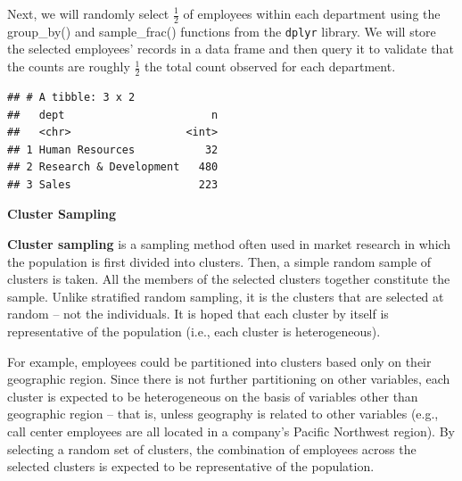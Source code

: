 \documentclass[]{book}
\newenvironment{Shaded}{\begin{snugshade}}{\end{snugshade}}
\newcommand{\CommentTok}[1]{\textcolor[rgb]{0.56,0.35,0.01}{\textit{#1}}}
\newcommand{\DataTypeTok}[1]{\textcolor[rgb]{0.13,0.29,0.53}{#1}}
\newcommand{\FloatTok}[1]{\textcolor[rgb]{0.00,0.00,0.81}{#1}}
\newcommand{\KeywordTok}[1]{\textcolor[rgb]{0.13,0.29,0.53}{\textbf{#1}}}
\newcommand{\NormalTok}[1]{#1}
\newcommand{\OperatorTok}[1]{\textcolor[rgb]{0.81,0.36,0.00}{\textbf{#1}}}
\newcommand{\StringTok}[1]{\textcolor[rgb]{0.31,0.60,0.02}{#1}}
\begin{document}
Next, we will randomly select \(\frac{1}{2}\) of employees within each department using the group\_by() and sample\_frac() functions from the \texttt{dplyr} library. We will store the selected employees' records in a data frame and then query it to validate that the counts are roughly \(\frac{1}{2}\) the total count observed for each department.

\begin{Shaded}
\end{Shaded}

\begin{verbatim}
## # A tibble: 3 x 2
##   dept                       n
##   <chr>                  <int>
## 1 Human Resources           32
## 2 Research & Development   480
## 3 Sales                    223
\end{verbatim}

\textbf{Cluster Sampling}

\textbf{Cluster sampling} is a sampling method often used in market research in which the population is first divided into clusters. Then, a simple random sample of clusters is taken. All the members of the selected clusters together constitute the sample. Unlike stratified random sampling, it is the clusters that are selected at random -- not the individuals. It is hoped that each cluster by itself is representative of the population (i.e., each cluster is heterogeneous).

For example, employees could be partitioned into clusters based only on their geographic region. Since there is not further partitioning on other variables, each cluster is expected to be heterogeneous on the basis of variables other than geographic region -- that is, unless geography is related to other variables (e.g., call center employees are all located in a company's Pacific Northwest region). By selecting a random set of clusters, the combination of employees across the selected clusters is expected to be representative of the population.
\end{document}
